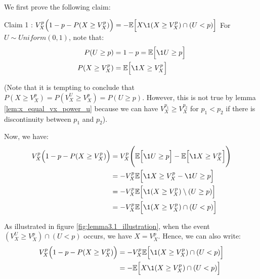 \begin{proof*}
    We first prove the following claim:

    \begin{subproof}{\newline Claim 1 : $V_X^p\Big(1-p-P(X\ge V_X^p) \Big)=-\mathbb{E}\Big[ X\1{ ( X\ge V_X^p ) \cap (U<p)} \Big]$}
        For $U\sim Uniform(0,1)$, note that:
        \begin{align*}
            P(U \ge p) &= 1 - p = \mathbb{E}\Big[ \1{U \ge p} \Big] \\
            P(X \ge V_X^p) &= \mathbb{E}\Big[ \1{X \ge V_X^p} \Big]
        \end{align*}

        \noindent (Note that it is tempting to conclude that $P(X\ge V_X^p)=P(V_X^U \ge V_X^p) = P(U\ge p)$. However, this is not true by lemma \ref{lem:x_equal_vx_power_u} because we can have $V_X^{p_1}\ge V_X^{p_2}$ for $p_1<p_2$ if there is discontinuity between $p_1$ and $p_2$). 

        \noindent \newline Now, we have:
        \begin{align*}
            V_X^p\Big( 1 - p - P(X\ge V_X^p) \Big) 
                &= V_X^p\Bigg( 
                    \mathbb{E}\Big[ \1{U\ge p} \Big] - \mathbb{E}\Big[ \1{X \ge V_X^p} \Big]
                \Bigg) \\
                &= - V_X^p \mathbb{E}\Big[ \1{X \ge V_X^p} - \1{U\ge p} \Big] \\ 
                &= - V_X^p \mathbb{E}\Big[ \1{(X \ge V_X^p)\setminus (U \ge p)} \Big] \\ 
                &= - V_X^p \mathbb{E}\Big[ \1{(X \ge V_X^p)\cap (U < p)} \Big] \\ 
        \end{align*}

        \noindent \newline As illustrated in figure \ref{fig:lemma3.1_illustration}, when the event $(V_X^U \ge V_X^p)\cap (U<p)$ occurs, we have $X=V_X^p$. Hence, we can also write:
        \begin{align*}
            V_X^p\Big( 1 - p - P(X\ge V_X^p) \Big) 
                &= - V_X^p \mathbb{E}\Big[ \1{(X \ge V_X^p)\cap (U < p)} \Big] \\ 
                &= - \mathbb{E}\Big[ X \1{(X \ge V_X^p)\cap (U < p)} \Big]
        \end{align*}
    \end{subproof}


\end{proof*}

